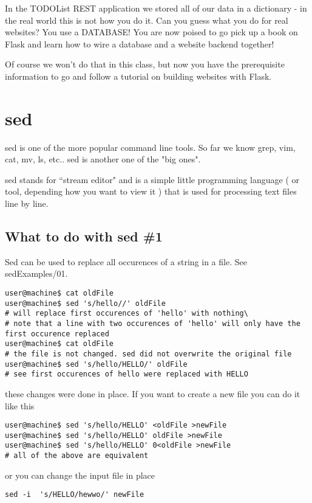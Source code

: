 \documentclass[10pt]{article}
\begin{document}
In the TODOList REST application we stored all of our data in a dictionary - in the real world this is not how you do it. Can you guess what you do for real websites? You use a DATABASE! You are now poised to go pick up a book on Flask and learn how to wire a database and a website backend together!

Of course we won't do that in this class, but now you have the prerequisite information to go and follow a tutorial on building websites with Flask.

\section{sed}
sed is one of the more popular command line tools. So far we know grep, vim, cat, mv, ls, etc.. sed is another one of the "big ones".

sed stands for ``stream editor" and is a simple little programming language ( or tool, depending how you want to view it ) that is used for processing text files line by line.

\subsection{What to do with sed \#1}
Sed can be used to replace all occurences of a string in a file.
See sedExamples/01.

\begin{lstlisting}
user@machine$ cat oldFile
user@machine$ sed 's/hello//' oldFile
# will replace first occurences of 'hello' with nothing\
# note that a line with two occurences of 'hello' will only have the first occurence replaced
user@machine$ cat oldFile
# the file is not changed. sed did not overwrite the original file
user@machine$ sed 's/hello/HELLO/' oldFile
# see first occurences of hello were replaced with HELLO
\end{lstlisting}

these changes were done in place. If you want to create a new file you can do it like this

\begin{lstlisting}
user@machine$ sed 's/hello/HELLO' <oldFile >newFile
user@machine$ sed 's/hello/HELLO' oldFile >newFile
user@machine$ sed 's/hello/HELLO' 0<oldFile >newFile
# all of the above are equivalent
\end{lstlisting}

or you can change the input file in place

\begin{lstlisting}
sed -i  's/HELLO/hewwo/' newFile
\end{lstlisting}
\end{document}
